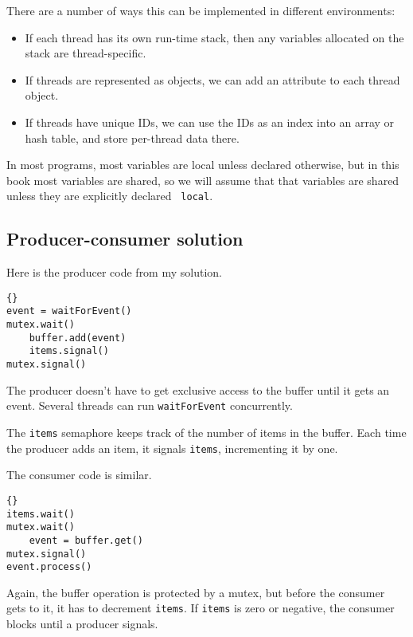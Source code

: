 \documentclass{book}
\newcommand{\clearemptydoublepage}{\newpage\cleardoublepage}
\begin{document}
There are a number of ways this can be implemented in different
environments:

\begin{itemize}

\item If each thread has its own run-time stack, then any variables
allocated on the stack are thread-specific.

\item If threads are represented as objects, we can add an attribute
to each thread object.

\item If threads have unique IDs, we can use the IDs as an index
into an array or hash table, and store per-thread data there.

\end{itemize}

In most programs, most variables are local unless declared otherwise,
but in this book most variables are shared, so we will assume that
that variables are shared unless they are explicitly declared {\tt
local}.



\clearemptydoublepage
\subsection{Producer-consumer solution}

Here is the producer code from my solution.

\begin{lstlisting}[title={Producer solution}]{}
event = waitForEvent()
mutex.wait()
    buffer.add(event)
    items.signal()
mutex.signal()
\end{lstlisting}

The producer doesn't have to get exclusive access to the buffer
until it gets an event.  Several threads can run {\tt waitForEvent}
concurrently.

The {\tt items} semaphore keeps track of the
number of items in the buffer.  Each time the producer adds an
item, it signals {\tt items}, incrementing it by one.

The consumer code is similar.

\begin{lstlisting}[title={Consumer solution}]{}
items.wait()
mutex.wait()
    event = buffer.get()
mutex.signal()
event.process()
\end{lstlisting}

Again, the buffer operation is protected by a mutex,
but before the consumer gets to it, it has to decrement
{\tt items}.  If {\tt items} is zero or negative, the
consumer blocks until a producer signals.
\end{document}
